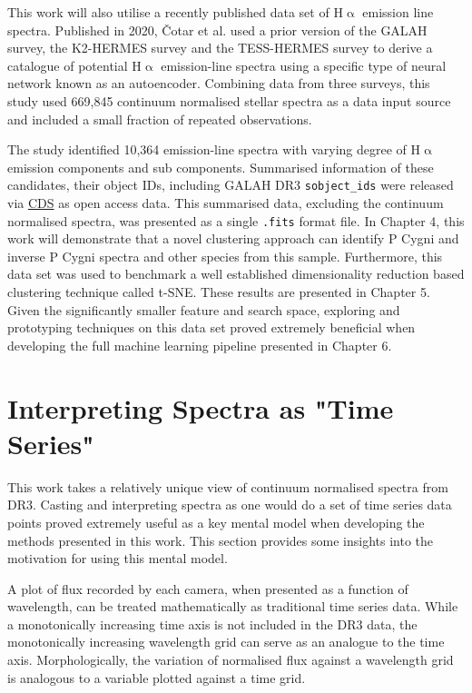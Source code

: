 This work will also utilise a recently published data set of H$\upalpha$ emission line spectra. Published in 2020, Čotar et al.\cite{vcotar2021galah} used a prior version of the GALAH survey\cite{de2015galah}, the K2-HERMES survey\cite{wittenmyer2018k2} and the TESS-HERMES survey\cite{sharma2018tess} to derive a catalogue of potential H$\upalpha$ emission-line spectra using a specific type of neural network known as an autoencoder. Combining data from three surveys, this study used 669,845 continuum normalised stellar spectra as a data input source and included a small fraction of repeated observations. 

The study identified 10,364 emission-line spectra with varying degree of H$\upalpha$ emission components and sub components. Summarised information of these candidates, their object IDs, including GALAH DR3 \texttt{sobject\_ids} were released via \href{https://cdsweb.u-strasbg.fr/}{CDS} as open access data. This summarised data, excluding the continuum normalised spectra, was presented as a single \texttt{.fits} format file. In Chapter 4, this work will demonstrate that a novel clustering approach can identify P Cygni and inverse P Cygni spectra and other species from this sample. Furthermore, this data set was used to benchmark a well established dimensionality reduction based clustering technique called t-SNE. These results are presented in Chapter 5. Given the significantly smaller feature and search space, exploring and prototyping techniques on this data set proved extremely beneficial when developing the full machine learning pipeline presented in Chapter 6.

\section{Interpreting Spectra as "Time Series"}

This work takes a relatively unique view of continuum normalised spectra from DR3. Casting and interpreting spectra as one would do a set of time series data points proved extremely useful as a key mental model when developing the methods presented in this work. This section provides some insights into the motivation for using this mental model. 

A plot of flux recorded by each camera, when presented as a function of wavelength, can be treated mathematically as traditional time series data. While a monotonically increasing time axis is not included in the DR3 data, the monotonically increasing wavelength grid can serve as an analogue to the time axis. Morphologically, the variation of normalised flux against a wavelength grid is analogous to a variable plotted against a time grid.

